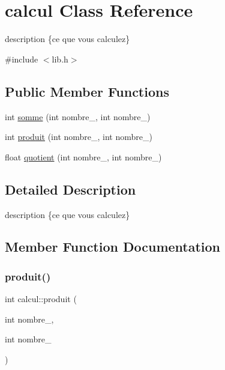 \hypertarget{classcalcul}{}\section{calcul Class Reference}
\label{classcalcul}


description \{ce que vous calculez\}  




{\ttfamily \#include $<$lib.\+h$>$}

\subsection*{Public Member Functions}
\begin{DoxyCompactItemize}
\item 
int \hyperlink{classcalcul_a40f51a847c5ac1001051a9631e5e1e08}{somme} (int nombre\+\_, int nombre\+\_)
\item 
int \hyperlink{classcalcul_ad277bab24eb4c6ad6e2a1c1dd7d41b0f}{produit} (int nombre\+\_, int nombre\+\_)
\item 
float \hyperlink{classcalcul_aaa34d4027cc5d842ea519688241a5788}{quotient} (int nombre\+\_, int nombre\+\_)
\end{DoxyCompactItemize}


\subsection{Detailed Description}
description \{ce que vous calculez\} 

\subsection{Member Function Documentation}
\mbox{\label{classcalcul_ad277bab24eb4c6ad6e2a1c1dd7d41b0f}} 
\subsubsection{\texorpdfstring{produit()}{produit()}}
{\footnotesize\ttfamily int calcul\+::produit (\begin{DoxyParamCaption}\item[{int}]{nombre\+\_,  }\item[{int}]{nombre\+\_ }\end{DoxyParamCaption})}



